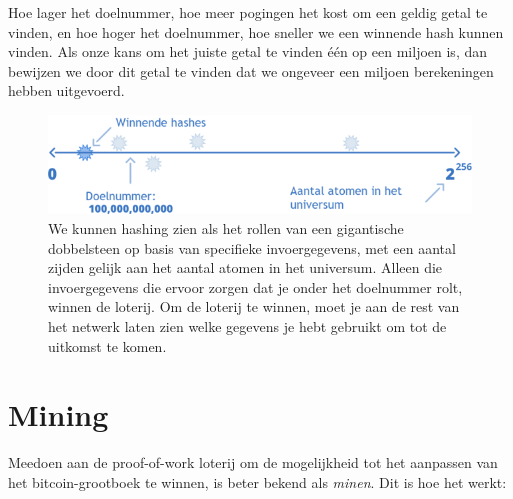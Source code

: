 \documentclass[
  letterpaper,
]{scrbook}
\begin{document}
Hoe lager het doelnummer, hoe meer pogingen het kost om een geldig getal
te vinden, en hoe hoger het doelnummer, hoe sneller we een winnende hash
kunnen vinden. Als onze kans om het juiste getal te vinden één op een
miljoen is, dan bewijzen we door dit getal te vinden dat we ongeveer een
miljoen berekeningen hebben uitgevoerd.

\begin{figure}

{\centering \includegraphics{./images/fig5.png}

}

\caption{\label{fig-fig5}We kunnen hashing zien als het rollen van een
gigantische dobbelsteen op basis van specifieke invoergegevens, met een
aantal zijden gelijk aan het aantal atomen in het universum. Alleen die
invoergegevens die ervoor zorgen dat je onder het doelnummer rolt,
winnen de loterij. Om de loterij te winnen, moet je aan de rest van het
netwerk laten zien welke gegevens je hebt gebruikt om tot de uitkomst te
komen.}

\end{figure}


\hypertarget{mining}{%
\chapter{Mining}\label{mining}}

Meedoen aan de proof-of-work loterij om de mogelijkheid tot het
aanpassen van het bitcoin-grootboek te winnen, is beter bekend als
\emph{minen}. Dit is hoe het werkt:
\end{document}
